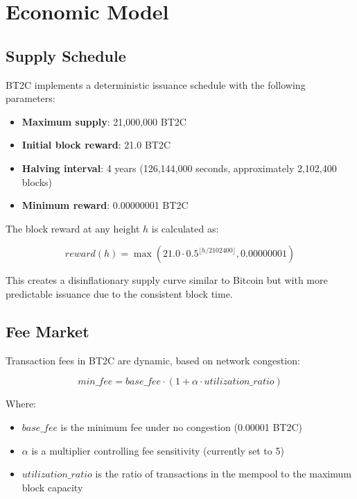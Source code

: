 \documentclass[10pt,a4paper]{article}
\begin{document}
\section{Economic Model}

\subsection{Supply Schedule}
BT2C implements a deterministic issuance schedule with the following parameters:

\begin{itemize}
\item \textbf{Maximum supply}: 21,000,000 BT2C
\item \textbf{Initial block reward}: 21.0 BT2C
\item \textbf{Halving interval}: 4 years (126,144,000 seconds, approximately 2,102,400 blocks)
\item \textbf{Minimum reward}: 0.00000001 BT2C
\end{itemize}

The block reward at any height $h$ is calculated as:

\begin{equation}
reward(h) = \max(21.0 \cdot 0.5^{\lfloor h/2102400 \rfloor}, 0.00000001)
\end{equation}

This creates a disinflationary supply curve similar to Bitcoin but with more predictable issuance due to the consistent block time.

\subsection{Fee Market}
Transaction fees in BT2C are dynamic, based on network congestion:

\begin{equation}
min\_fee = base\_fee \cdot (1 + \alpha \cdot utilization\_ratio)
\end{equation}

Where:
\begin{itemize}
\item $base\_fee$ is the minimum fee under no congestion (0.00001 BT2C)
\item $\alpha$ is a multiplier controlling fee sensitivity (currently set to 5)
\item $utilization\_ratio$ is the ratio of transactions in the mempool to the maximum block capacity
\end{itemize}
\end{document}
